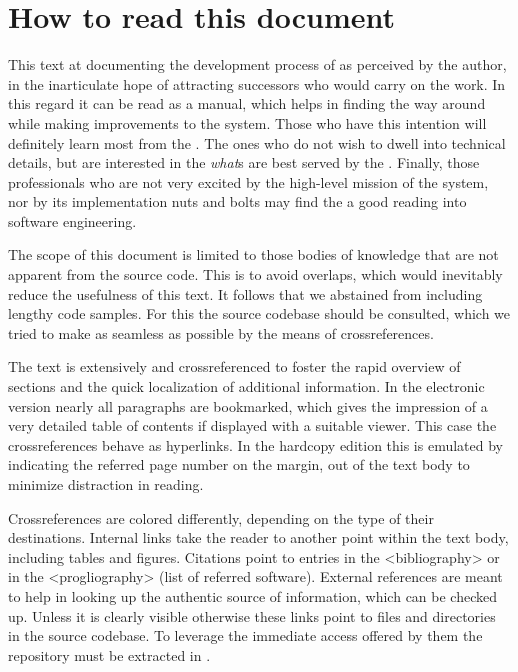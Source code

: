 %
%

\clearpage
\section*{How to read this document}
\thispagestyle{plain}

This text  at documenting the development process
of \Menugene as perceived by the author, in the inarticulate hope of
attracting successors who would carry on the work.  In this regard it
can be read as a manual, which helps in finding the way around while
making improvements to the system.  Those who have this intention will
definitely learn most from the .  The ones
who do not wish to dwell into technical details, but are interested in
the \emph{what}s are best served by the .  Finally, those professionals who are not very excited by
the high-level mission of the system, nor by its implementation nuts and
bolts may find the 
a good reading into software engineering.

The scope of this document is limited to those bodies of knowledge that
are not apparent from the source code.  This is to avoid overlaps, which
would inevitably reduce the usefulness of this text.  It follows that
we abstained from including lengthy code samples.  For this the source
codebase should be consulted, which we tried to make as seamless as
possible by the means of crossreferences.

The text is extensively  and
crossreferenced to foster the rapid overview of sections and the
quick localization of additional information.  In the electronic
version nearly all paragraphs are bookmarked, which gives the
impression of a very detailed table of contents if displayed
with a suitable viewer.  This case the crossreferences behave
as hyperlinks.  In the hardcopy edition this is emulated by
indicating the referred page number on the margin, out of the
text body to minimize distraction in reading.

\makeatletter
Crossreferences are colored differently, depending on the type of
their destinations.  \textcolor{\@linkcolor}{Internal links} take the
reader to another point within the text body, including tables and
figures.  \textcolor{\@citecolor}{Citations} point to entries in the
\Link<bibliography> or in the \Link<progliography> (list of referred
software).  \textcolor{\@urlcolor}{External references} are meant to
help in looking up the authentic source of information, which can be
checked up.  Unless it is clearly visible otherwise these links point to
files and directories in the source codebase.  To leverage the immediate
access offered by them the repository must be extracted in .
\makeatother

